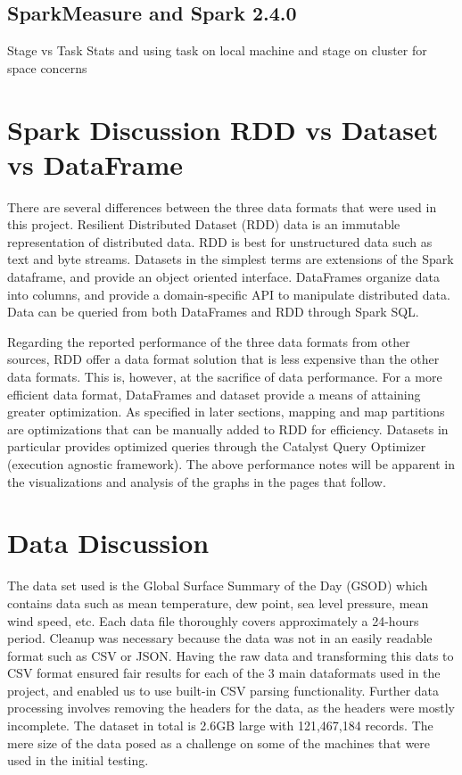 \documentclass[conference]{IEEEtran}
\begin{document}
\subsection{SparkMeasure and Spark 2.4.0}

Stage vs Task Stats and using task on local machine and stage on cluster for space concerns

\section{Spark Discussion RDD vs Dataset vs DataFrame}

There are several differences between the three data formats that were used in this project.
Resilient Distributed Dataset (RDD) data is an immutable representation of distributed data.
RDD is best for unstructured data such as text and byte streams.
Datasets in the simplest terms are extensions of the Spark dataframe, and provide an object oriented interface.
DataFrames organize data into columns, and provide a domain-specific API to manipulate distributed data.
Data can be queried from both DataFrames and RDD through Spark SQL.\cite{b1}

Regarding the reported performance of the three data formats from other sources,
RDD offer a data format solution that is less expensive than the other data formats.
This is, however, at the sacrifice of data performance. For a more efficient data format, DataFrames and dataset provide
a means of attaining greater optimization.\cite{b3}
As specified in later sections, mapping and map partitions are optimizations that can be manually added to RDD
for efficiency.
Datasets in particular provides optimized queries through the Catalyst Query Optimizer (execution agnostic framework).
The above performance notes will be apparent in the visualizations and analysis of the graphs in the pages that follow.

\section{Data Discussion}
The data set used is the Global Surface Summary of the Day (GSOD) which contains data such as mean temperature, dew point, sea level pressure, mean wind speed, etc.
Each data file thoroughly covers approximately a 24-hours period.\cite{b7}
Cleanup was necessary because the data was not in an easily readable format such as CSV or JSON. Having the raw data and transforming this dats to CSV format ensured fair results for each of the 3 main dataformats used in the project, and enabled us to use built-in CSV parsing functionality.
Further data processing involves removing the headers for the data, as the headers were mostly incomplete.
The dataset in total is 2.6GB large with 121,467,184 records. The mere size of the data posed as a challenge on some of the machines that were used in the initial testing.
\end{document}
